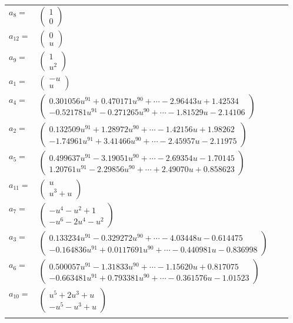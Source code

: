 \documentclass[1p]{elsarticle_modified}
\theoremstyle{definition}
\begin{document}
\begin{tabular}{m{7pt} m{180pt} m{7pt} m{180pt} }
\flushright $a_{8}=$&$\begin{pmatrix}1\\0\end{pmatrix}$ \\
\flushright $a_{12}=$&$\begin{pmatrix}0\\u\end{pmatrix}$ \\
\flushright $a_{9}=$&$\begin{pmatrix}1\\u^2\end{pmatrix}$ \\
\flushright $a_{1}=$&$\begin{pmatrix}- u\\u\end{pmatrix}$ \\
\flushright $a_{4}=$&$\begin{pmatrix}0.301056 u^{91}+0.470171 u^{90}+\cdots-2.96443 u+1.42534\\-0.521781 u^{91}-0.271265 u^{90}+\cdots-1.81529 u-2.14106\end{pmatrix}$ \\
\flushright $a_{2}=$&$\begin{pmatrix}0.132509 u^{91}+1.28972 u^{90}+\cdots-1.42156 u+1.98262\\-1.74961 u^{91}+3.41466 u^{90}+\cdots-2.45957 u-2.11975\end{pmatrix}$ \\
\flushright $a_{5}=$&$\begin{pmatrix}0.499637 u^{91}-3.19051 u^{90}+\cdots-2.69354 u-1.70145\\1.20761 u^{91}-2.29856 u^{90}+\cdots+2.49070 u+0.858623\end{pmatrix}$ \\
\flushright $a_{11}=$&$\begin{pmatrix}u\\u^3+u\end{pmatrix}$ \\
\flushright $a_{7}=$&$\begin{pmatrix}- u^4- u^2+1\\- u^6-2 u^4- u^2\end{pmatrix}$ \\
\flushright $a_{3}=$&$\begin{pmatrix}0.133234 u^{91}-0.329272 u^{90}+\cdots-4.03448 u-0.614475\\-0.164836 u^{91}+0.0117691 u^{90}+\cdots-0.440981 u-0.836998\end{pmatrix}$ \\
\flushright $a_{6}=$&$\begin{pmatrix}0.500057 u^{91}-1.31833 u^{90}+\cdots-1.15620 u+0.817075\\-0.663481 u^{91}+0.793381 u^{90}+\cdots-0.361576 u-1.01523\end{pmatrix}$ \\
\flushright $a_{10}=$&$\begin{pmatrix}u^5+2 u^3+u\\- u^5- u^3+u\end{pmatrix}$\\&\end{tabular}
\end{document}
